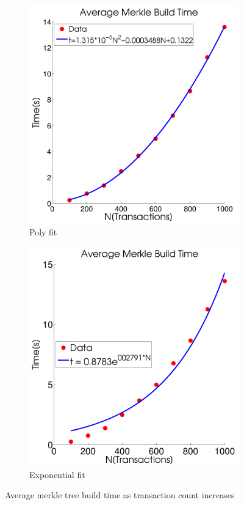 \documentclass[pdftex,11pt]{article}
\begin{document}
\begin{figure}[H]
	\centering
	\begin{subfigure}[H]{0.4\textwidth}
		\includegraphics[width=\textwidth]{figures/MerkPoly.pdf}
		\caption{Poly fit}
	\end{subfigure}
	\begin{subfigure}[H]{0.4\textwidth}
		\includegraphics[width=\textwidth]{figures/MerkExp.pdf}
		\caption{Exponential fit}
	\end{subfigure}
	\caption{Average merkle tree build time as transaction count increases}
	\label{fig:merk}
\end{figure}
\end{document}
